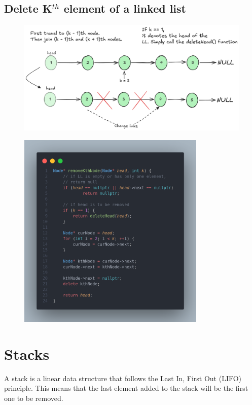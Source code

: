 \documentclass[a4paper, 12pt]{book}
\begin{document}
	\subsection{Delete K$^{th}$ element of a linked list}
	\begin{figure}[H]
		\hspace{-6mm}
		\includegraphics[width=1.1\textwidth]{deletekthnodecode.png}
		\label{fig:deletekthnodecode}
	\end{figure}
	\begin{figure}[H]
		\centering
		\includegraphics[width=0.8\textwidth]{deleteknode.png}
		\label{fig:deleteknode}
	\end{figure}
	\newpage
	
	\section{Stacks}
	A stack is a linear data structure that follows the Last In, First Out (LIFO) principle. This means that the last element added to the stack will be the first one to be removed.
\end{document}
